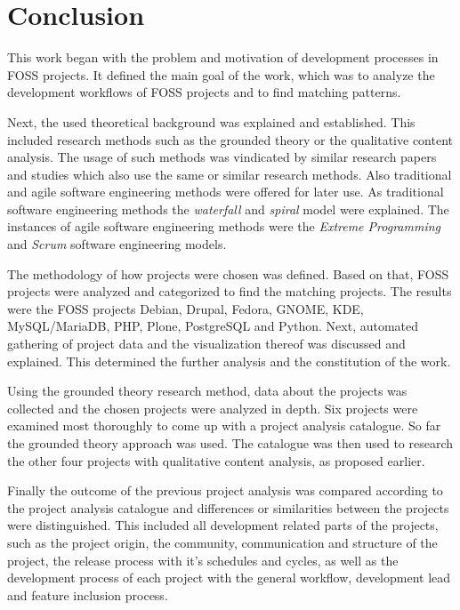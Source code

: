 \chapter{Conclusion} %
\label{chap:conclusion}

This work began with the problem and motivation of development processes in
\ac{FOSS} projects. It defined the main goal of the work, which was to analyze
the development workflows of \ac{FOSS} projects and to find matching patterns.

Next, the used theoretical background was explained and established. This
included research methods such as the grounded theory or the qualitative
content analysis. The usage of such methods was vindicated by similar research
papers and studies which also use the same or similar research methods. Also
traditional and agile software engineering methods were offered for later use.
As traditional software engineering methods the \emph{waterfall} and
\emph{spiral} model were explained. The instances of agile software engineering
methods were the \emph{Extreme Programming} and \emph{Scrum} software
engineering models.

The methodology of how projects were chosen was defined. Based on that,
\ac{FOSS} projects were analyzed and categorized to find the matching projects.
The results were the \ac{FOSS} projects Debian, Drupal, Fedora, GNOME, KDE,
MySQL/MariaDB, PHP, Plone, PostgreSQL and Python. Next, automated gathering of
project data and the visualization thereof was discussed and explained. This
determined the further analysis and the constitution of the work.

Using the grounded theory research method, data about the projects was
collected and the chosen projects were analyzed in depth. Six projects were
examined most thoroughly to come up with a project analysis catalogue. So far
the grounded theory approach was used. The catalogue was then used to research
the other four projects with qualitative content analysis, as proposed earlier.

Finally the outcome of the previous project analysis was compared according to
the project analysis catalogue and differences or similarities between the
projects were distinguished. This included all development related parts of the
projects, such as the project origin, the community, communication and
structure of the project, the release process with it's schedules and cycles,
as well as the development process of each project with the general workflow,
development lead and feature inclusion process.

